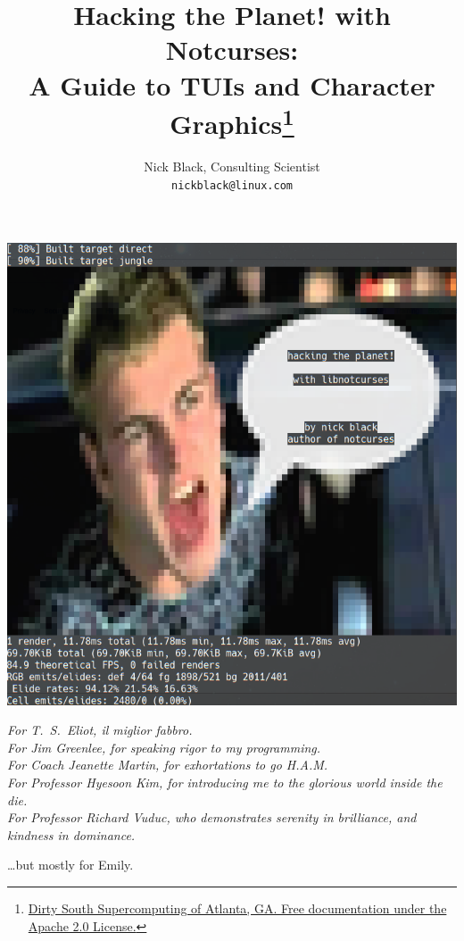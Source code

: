 \documentclass[letterpaper,10pt]{article}
\title{Hacking the Planet! with Notcurses:\\
A Guide to TUIs and Character Graphics\thanks{
 \href{https://www.dsscaw.com/}{Dirty South Supercomputing of Atlanta, GA. Free documentation under the Apache 2.0 License.}
}\\
}
\author{Nick Black, Consulting Scientist\\
\texttt{nickblack@linux.com}
}
\begin{document}
\maketitle
\date{}
\vspace{1in}
\begin{center}
\includegraphics[width=.75\linewidth]{htp-with-notcurses.png}
\end{center}
\thispagestyle{empty}

\clearpage
{}

\vspace*{1in}
\begin{center}
  \textit{For T.\ S.\ Eliot, il miglior fabbro.} \\
  \vspace{.25in}
  \textit{For Jim Greenlee, for speaking rigor to my programming.\\
  \vspace{.25in}
  For Coach Jeanette Martin, for exhortations to go H.A.M. \\
  \vspace{.25in}
    For Professor Hyesoon Kim, for introducing me to the glorious world
    inside the die.\\
  \vspace{.25in}
    For Professor Richard Vuduc, who
    demonstrates serenity in brilliance, and kindness in dominance.\\}

  \vspace{1in}\ldots but mostly for Emily.
\end{center}
\clearpage
\end{document}
